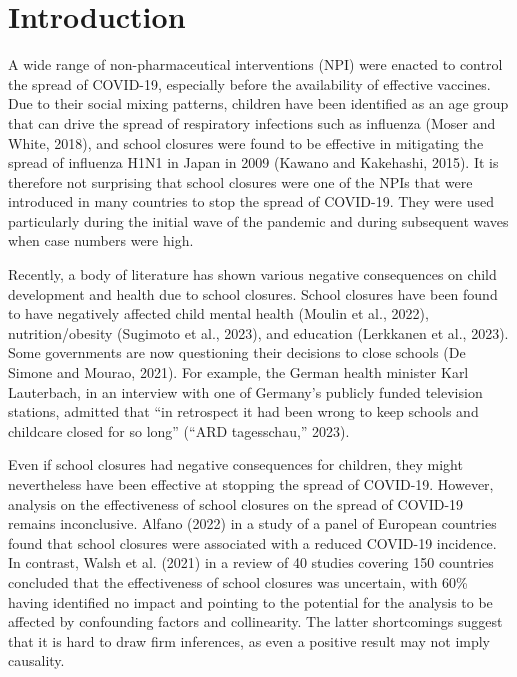 \documentclass[unnumsec,webpdf,contemporary,large]{oup-authoring-template}%
\theoremstyle{thmstyleone}%
\theoremstyle{thmstyletwo}%
\theoremstyle{thmstylethree}%
\begin{document}

\maketitle








\hypertarget{introduction}{%
\section{Introduction}\label{introduction}}

A wide range of non-pharmaceutical interventions (NPI) were enacted to control the spread of COVID-19, especially before the availability of effective vaccines. Due to their social mixing patterns, children have been identified as an age group that can drive the spread of respiratory infections such as influenza (Moser and White, 2018), and school closures were found to be effective in mitigating the spread of influenza H1N1 in Japan in 2009 (Kawano and Kakehashi, 2015). It is therefore not surprising that school closures were one of the NPIs that were introduced in many countries to stop the spread of COVID-19. They were used particularly during the initial wave of the pandemic and during subsequent waves when case numbers were high.

Recently, a body of literature has shown various negative consequences on child development and health due to school closures. School closures have been found to have negatively affected child mental health (Moulin et al., 2022), nutrition/obesity (Sugimoto et al., 2023), and education (Lerkkanen et al., 2023). Some governments are now questioning their decisions to close schools (De Simone and Mourao, 2021). For example, the German health minister Karl Lauterbach, in an interview with one of Germany's publicly funded television stations, admitted that ``in retrospect it had been wrong to keep schools and childcare closed for so long'' ({``ARD tagesschau,''} 2023).

Even if school closures had negative consequences for children, they might nevertheless have been effective at stopping the spread of COVID-19. However, analysis on the effectiveness of school closures on the spread of COVID-19 remains inconclusive. Alfano (2022) in a study of a panel of European countries found that school closures were associated with a reduced COVID-19 incidence. In contrast, Walsh et al. (2021) in a review of 40 studies covering 150 countries concluded that the effectiveness of school closures was uncertain, with 60\% having identified no impact and pointing to the potential for the analysis to be affected by confounding factors and collinearity. The latter shortcomings suggest that it is hard to draw firm inferences, as even a positive result may not imply causality.
\end{document}
